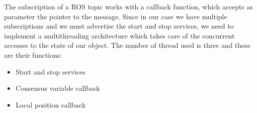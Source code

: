 The subscription of a ROS topic works with a callback function, which accepts as
parameter the pointer to the message. Since in our case we have multiple subscriptions
and we must advertise the start and stop services, we need to implement a multithreading
architecture which takes care of the concurrent accesses to the state of our object.
The number of thread used is three and these are their functions:
\begin{itemize}
  \item Start and stop services
  \item Consensus variable callback
  \item Local position callback
\end{itemize}






